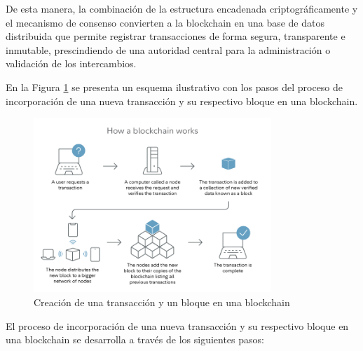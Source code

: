 De esta manera, la combinación de la estructura encadenada criptográficamente y el mecanismo de consenso convierten a la blockchain en una base de datos distribuida que permite registrar transacciones de forma segura, transparente e inmutable, prescindiendo de una autoridad central para la administración o validación de los intercambios.

En la Figura \ref{fig:blockchain-working} se presenta un esquema ilustrativo con los pasos del proceso de incorporación de una nueva transacción y su respectivo bloque en una blockchain. 

\begin{figure}[!htpb]
    \centering
    \includegraphics[width=0.8\textwidth]{Figures/block-creation.png}
    \caption{Creación de una transacción y un bloque en una blockchain}
    \label{fig:blockchain-working}
\end{figure}

El proceso de incorporación de una nueva transacción y su respectivo bloque en una blockchain se desarrolla a través de los siguientes pasos:

